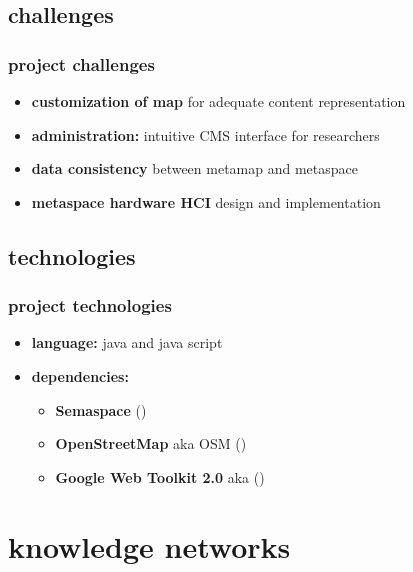 \documentclass[blue]{beamer}
\begin{document}
\subsection{challenges}
\frame
{
\frametitle{\textbf{project challenges}}
\begin{itemize}
\item \textbf{customization of map} for adequate content representation
\item \textbf{administration:} intuitive CMS interface for researchers
\item \textbf{data consistency} between metamap and metaspace
\item \textbf{metaspace hardware HCI} design and implementation
\end{itemize}
}


\subsection{technologies}
\frame
{
\frametitle{\textbf{project technologies}}
\begin{itemize}
\item \textbf{language:} java and java script
\item \textbf{dependencies:}
  \begin{itemize}
    \item \textbf{Semaspace} ()
    \item \textbf{OpenStreetMap} aka OSM ()
    \item \textbf{Google Web Toolkit 2.0} aka ()
  \end{itemize}
\end{itemize}
}


\section{knowledge networks}
\end{document}
